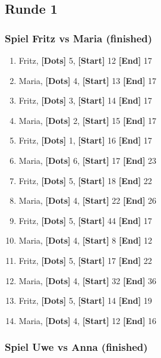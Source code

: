 \documentclass{article}
\begin{document}
    \subsection{Runde 1}

    \subsubsection*{Spiel Fritz vs Maria (finished)}

  \begin{enumerate}

    \item Fritz,
      \textbf{[Dots]} 5,
      \textbf{[Start]} 12
      \textbf{[End]} 17
    \item Maria,
      \textbf{[Dots]} 4,
      \textbf{[Start]} 13
      \textbf{[End]} 17
    \item Fritz,
      \textbf{[Dots]} 3,
      \textbf{[Start]} 14
      \textbf{[End]} 17
    \item Maria,
      \textbf{[Dots]} 2,
      \textbf{[Start]} 15
      \textbf{[End]} 17
    \item Fritz,
      \textbf{[Dots]} 1,
      \textbf{[Start]} 16
      \textbf{[End]} 17
    \item Maria,
      \textbf{[Dots]} 6,
      \textbf{[Start]} 17
      \textbf{[End]} 23
    \item Fritz,
      \textbf{[Dots]} 5,
      \textbf{[Start]} 18
      \textbf{[End]} 22
    \item Maria,
      \textbf{[Dots]} 4,
      \textbf{[Start]} 22
      \textbf{[End]} 26
    \item Fritz,
      \textbf{[Dots]} 5,
      \textbf{[Start]} 44
      \textbf{[End]} 17
    \item Maria,
      \textbf{[Dots]} 4,
      \textbf{[Start]} 8
      \textbf{[End]} 12
    \item Fritz,
      \textbf{[Dots]} 5,
      \textbf{[Start]} 17
      \textbf{[End]} 22
    \item Maria,
      \textbf{[Dots]} 4,
      \textbf{[Start]} 32
      \textbf{[End]} 36
    \item Fritz,
      \textbf{[Dots]} 5,
      \textbf{[Start]} 14
      \textbf{[End]} 19
    \item Maria,
      \textbf{[Dots]} 4,
      \textbf{[Start]} 12
      \textbf{[End]} 16
  \end{enumerate}

    \subsubsection*{Spiel Uwe vs Anna (finished)}
\end{document}
